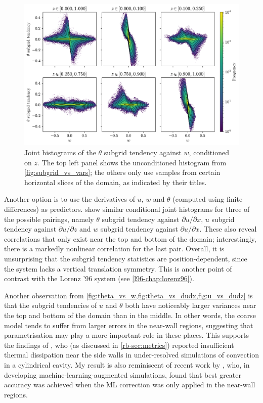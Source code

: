 \documentclass[../main.tex]{subfiles}
\begin{document}
\begin{figure}[ht]
    \centering
    \includegraphics[width=0.9\linewidth]{figures/theta_vs_w.pdf}
    \caption{
        Joint histograms of the $\theta$ subgrid tendency against $w$,
        conditioned on $z$. The top left panel shows the unconditioned
        histogram from \cref{fig:subgrid_vs_vars}; the others only use samples
        from certain horizontal slices of the domain, as indicated by their
        titles.
    }
    \label{fig:theta_vs_w}
\end{figure}

Another option is to use the derivatives of $u$, $w$ and $\theta$ (computed
using finite differences) as predictors.
 show similar conditional joint
histograms for three of the possible pairings, namely $\theta$ subgrid tendency
against $\partial u/\partial x$, $u$ subgrid tendency against $\partial
u/\partial z$ and $w$ subgrid tendency against $\partial u/\partial x$. These
also reveal correlations that only exist near the top and bottom of the domain;
interestingly, there is a markedly nonlinear correlation for the last pair.
Overall, it is unsurprising that the subgrid tendency statistics are
position-dependent, since the system lacks a vertical translation symmetry.
This is another point of contrast with the Lorenz '96 system (see
\cref{l96-chap:lorenz96}).

Another observation from \cref{fig:theta_vs_w,fig:theta_vs_dudx,fig:u_vs_dudz}
is that the subgrid tendencies of $u$ and $\theta$ both have noticeably larger
variances near the top and bottom of the domain than in the middle. In other
words, the coarse model tends to suffer from larger errors in the near-wall
regions, suggesting that parametrisation may play a more important role in
these places. This supports the findings of \textcite{stevens2010}, who (as
discussed in \cref{rb-sec:metrics}) reported insufficient thermal dissipation
near the side walls in under-resolved simulations of \rb{} convection in a
cylindrical cavity. My result is also reminiscent of recent work by
\textcite{alieva2023}, who, in developing machine-learning-augmented \rb{}
simulations, found that best greater accuracy was achieved when the ML
correction was only applied in the near-wall regions.
\end{document}
